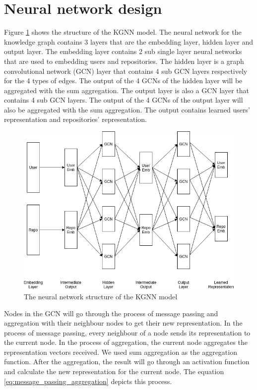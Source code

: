 \documentclass[11pt,twoside]{report}
\begin{document}
\section{Neural network design}
Figure \ref{fig:kgnn_structure} shows the structure of the KGNN model. The neural network for the knowledge graph contains 3 layers that are the embedding layer, hidden layer and output layer. The embedding layer contains 2 sub single layer neural networks that are used to embedding users and repositories. The hidden layer is a graph convolutional network (GCN) \cite{kipf_semi-supervised_2017} layer that contains 4 sub GCN layers respectively for the 4 types of edges. The output of the 4 GCNs of the hidden layer will be aggregated with the sum aggregation. The output layer is also a GCN layer that contains 4 sub GCN layers. The output of the 4 GCNs of the output layer will also be aggregated with the sum aggregation. The output contains learned users' representation and repositories' representation.

\begin{figure}[H]
    \centering
    \includegraphics[scale=0.6]{KGCN Structure.png}
    \caption{The neural network structure of the KGNN model}
    \label{fig:kgnn_structure}
\end{figure}

Nodes in the GCN will go through the process of message passing and aggregation with their neighbour nodes to get their new representation. In the process of message passing, every neighbour of a node sends its representation to the current node. In the process of aggregation, the current node aggregates the representation vectors received. We used sum aggregation as the aggregation function. After the aggregation, the result will go through an activation function and calculate the new representation for the current node. The equation \ref{eq:message_passing_aggregation} depicts this process.
\end{document}
